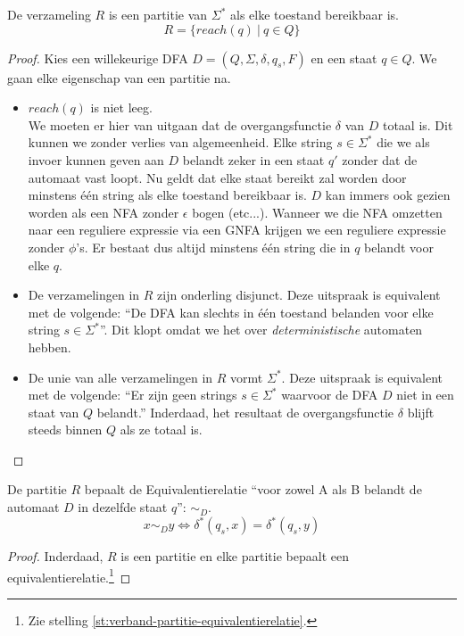 \documentclass[main.tex]{subfiles}
\begin{document}
\begin{st}
  De verzameling $R$ is een partitie van $\Sigma^{*}$ als elke toestand bereikbaar is.
  \[ R = \{ reach(q)\ |\ q \in Q \} \]

  \begin{proof}
    Kies een willekeurige DFA $D = (Q,\Sigma,\delta,q_{s},F)$ en een staat $q\in Q$.
    We gaan elke eigenschap van een partitie na.
    \begin{itemize}
    \item $reach(q)$ is niet leeg.\\
      We moeten er hier van uitgaan dat de overgangsfunctie $\delta$ van $D$ totaal is.
      Dit kunnen we zonder verlies van algemeenheid.
      Elke string $s\in \Sigma^*$ die we als invoer kunnen geven aan $D$ belandt zeker in een staat $q'$ zonder dat de automaat vast loopt.
      Nu geldt dat elke staat bereikt zal worden door minstens \'e\'en string als elke toestand bereikbaar is.
      $D$ kan immers ook gezien worden als een NFA zonder $\epsilon$ bogen (etc...). Wanneer we die NFA omzetten naar een reguliere expressie via een GNFA krijgen we een reguliere expressie zonder $\phi$'s. Er bestaat dus altijd minstens \'e\'en string die in $q$ belandt voor elke $q$.
    \item De verzamelingen in $R$ zijn onderling disjunct.
      Deze uitspraak is equivalent met de volgende: ``De DFA kan slechts in \'e\'en toestand belanden voor elke string $s\in\Sigma^{*}$''. Dit klopt omdat we het over \emph{deterministische} automaten hebben.
    \item De unie van alle verzamelingen in $R$ vormt $\Sigma^{*}$.
      Deze uitspraak is equivalent met de volgende: ``Er zijn geen strings $s\in \Sigma^{*}$ waarvoor de DFA $D$ niet in een staat van $Q$ belandt.''
      Inderdaad, het resultaat de overgangsfunctie $\delta$ blijft steeds binnen $Q$ als ze totaal is.
    \end{itemize}
  \end{proof}
\end{st}

\begin{gev}
  De partitie $R$ bepaalt de Equivalentierelatie ``voor zowel A als B belandt de automaat $D$ in dezelfde staat $q$'': $\sim_{D}$.
  \[ x \sim_{D} y \Leftrightarrow \delta^{*}(q_{s},x) = \delta^{*}(q_{s},y) \]

  \begin{proof}
    Inderdaad, $R$ is een partitie en elke partitie bepaalt een equivalentierelatie.\footnote{Zie stelling \ref{st:verband-partitie-equivalentierelatie}.}
  \end{proof}
\end{gev}
\end{document}
